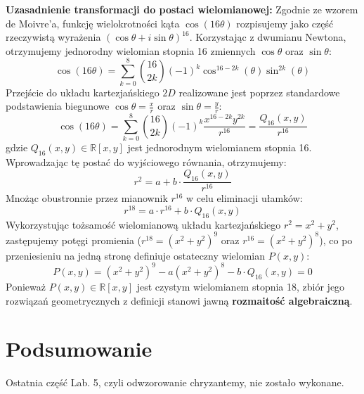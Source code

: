 \documentclass[a4paper,11pt]{article}
\begin{document}
\noindent \textbf{Uzasadnienie transformacji do postaci wielomianowej:}
Zgodnie ze wzorem de Moivre'a, funkcję wielokrotności kąta $\cos(16\theta)$ rozpisujemy jako część rzeczywistą wyrażenia $(\cos\theta + i\sin\theta)^{16}$. Korzystając z dwumianu Newtona, otrzymujemy jednorodny wielomian stopnia 16 zmiennych $\cos\theta$ oraz $\sin\theta$:
\[ \cos(16\theta) = \sum_{k=0}^{8} \binom{16}{2k} (-1)^k \cos^{16-2k}(\theta) \sin^{2k}(\theta) \]
Przejście do układu kartezjańskiego $2D$ realizowane jest poprzez standardowe podstawienia biegunowe $\cos\theta = \frac{x}{r}$ oraz $\sin\theta = \frac{y}{r}$:
\[ \cos(16\theta) = \sum_{k=0}^{8} \binom{16}{2k} (-1)^k \frac{x^{16-2k} y^{2k}}{r^{16}} = \frac{Q_{16}(x, y)}{r^{16}} \]
gdzie $Q_{16}(x, y) \in \mathbb{R}[x,y]$ jest jednorodnym wielomianem stopnia 16. Wprowadzając tę postać do wyjściowego równania, otrzymujemy:
\[ r^2 = a + b \cdot \frac{Q_{16}(x, y)}{r^{16}} \]
Mnożąc obustronnie przez mianownik $r^{16}$ w celu eliminacji ułamków:
\[ r^{18} = a \cdot r^{16} + b \cdot Q_{16}(x, y) \]
Wykorzystując tożsamość wielomianową układu kartezjańskiego $r^2 = x^2 + y^2$, zastępujemy potęgi promienia ($r^{18} = (x^2 + y^2)^9$ oraz $r^{16} = (x^2 + y^2)^8$), co po przeniesieniu na jedną stronę definiuje ostateczny wielomian $P(x, y)$:
\[ P(x, y) = (x^2 + y^2)^9 - a(x^2 + y^2)^8 - b \cdot Q_{16}(x, y) = 0 \]
Ponieważ $P(x, y) \in \mathbb{R}[x, y]$ jest czystym wielomianem stopnia 18, zbiór jego rozwiązań geometrycznych z definicji stanowi jawną \textbf{rozmaitość algebraiczną}.

\section{Podsumowanie}
Ostatnia część Lab. 5, czyli odwzorowanie chryzantemy, nie zostało wykonane.
\end{document}
